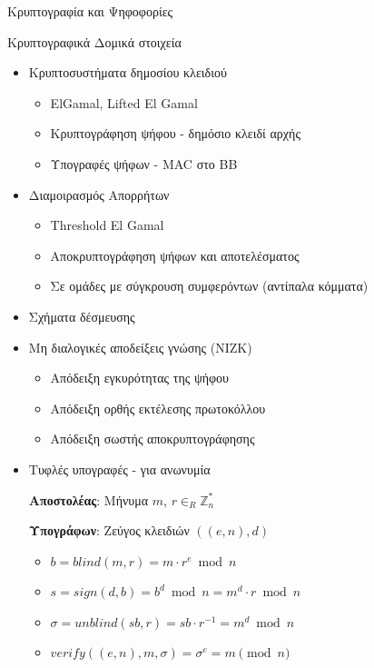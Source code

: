 \documentclass[handout]{beamer}
\begin{document}
\begin{section}{Κρυπτογραφία και Ψηφοφορίες}
\begin{frame}[allowframebreaks]{Κρυπτογραφικά Δομικά στοιχεία}
  
\begin{itemize}
    \item Κρυπτοσυστήματα δημοσίου κλειδιού
    \begin{itemize}
        \item ElGamal, Lifted El Gamal
        \item Κρυπτογράφηση ψήφου - δημόσιο κλειδί αρχής
        \item Υπογραφές ψήφων - MAC στο BB
    \end{itemize} 
    \item Διαμοιρασμός Απορρήτων
    \begin{itemize}
        \item Threshold El Gamal
        \item Αποκρυπτογράφηση ψήφων και αποτελέσματος
        \item Σε ομάδες με σύγκρουση συμφερόντων (αντίπαλα κόμματα)
    \end{itemize} 
    \item Σχήματα δέσμευσης 
    \framebreak
    \item Μη διαλογικές αποδείξεις γνώσης (NIZK) 
    \begin{itemize}
        \item Απόδειξη εγκυρότητας της ψήφου
        \item Απόδειξη ορθής εκτέλεσης πρωτοκόλλου
        \item Απόδειξη σωστής αποκρυπτογράφησης
    \end{itemize} 
    \item Τυφλές υπογραφές - για ανωνυμία 
    

\textbf{Αποστολέας}: Μήνυμα $m$, $r \in_R \mathbb{Z}_n^*$

\textbf{Υπογράφων}: Ζεύγος κλειδιών $((e,n), d)$

\begin{itemize}  \setlength\itemsep{.1em}
\item $b=blind(m,r) = m \cdot r^e \bmod{n}$
\item $s = sign(d,b) = b^d \bmod{n} =  m^d \cdot r \bmod{n} $
\item $\sigma = unblind(sb,r) = sb \cdot r^{-1} = m^d \bmod{n}$
\item $verify((e,n),m,\sigma) = \sigma^e = m \pmod{n}$
\end{itemize}
\end{itemize}
 

\end{frame}

\end{section} 
\end{document}
